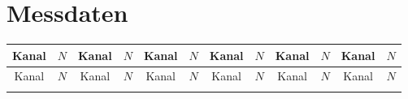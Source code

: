 \section{Messdaten}
\label{sec:Messdaten}

\begin{center}
    \begin{longtable}{S[table-format=3.0]
                      S[table-format=3.0]|
                      S[table-format=3.0]
                      S[table-format=3.0]|
                      S[table-format=3.0]
                      S[table-format=3.0]|
                      S[table-format=3.0]
                      S[table-format=3.0]|
                      S[table-format=3.0]
                      S[table-format=3.0]|
                      S[table-format=3.0]
                      S[table-format=3.0]}

    \toprule
    {Kanal} & {$N$} & {Kanal} & {$N$} & {Kanal} & {$N$} & {Kanal} & {$N$} & {Kanal} & {$N$} & {Kanal} & {$N$}\\
    \midrule
    \endfirsthead

    \midrule
    {Kanal} & {$N$} & {Kanal} & {$N$} & {Kanal} & {$N$} & {Kanal} & {$N$} & {Kanal} & {$N$} & {Kanal} & {$N$}\\
    \midrule
    \endhead

    \bottomrule
    \endfoot


\end{longtable}
\end{center}
